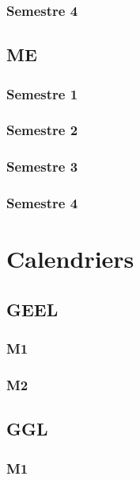 \documentclass[a4paper,11pt]{article}
\begin{document}
\subsubsection{Semestre 4}


\subsection{ME}

\subsubsection{Semestre 1}

\subsubsection{Semestre 2}

\subsubsection{Semestre 3}

\subsubsection{Semestre 4}


\section{Calendriers}\label{Calendrier}

\subsection{GEEL}

\subsubsection{M1}

\subsubsection{M2}


\subsection{GGL}

\subsubsection{M1}
\end{document}
